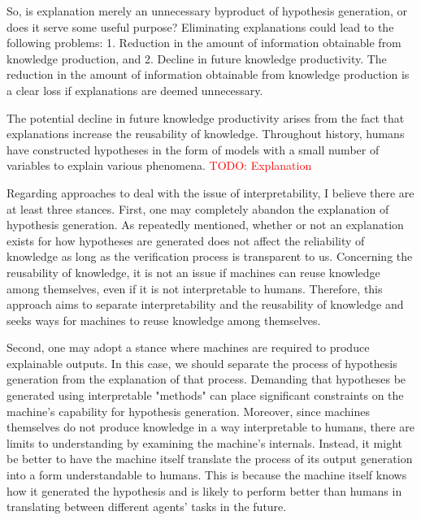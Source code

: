 So, is explanation merely an unnecessary byproduct of hypothesis generation, or does it serve some useful purpose? Eliminating explanations could lead to the following problems: 1. Reduction in the amount of information obtainable from knowledge production, and 2. Decline in future knowledge productivity. The reduction in the amount of information obtainable from knowledge production is a clear loss if explanations are deemed unnecessary.

The potential decline in future knowledge productivity arises from the fact that explanations increase the reusability of knowledge. Throughout history, humans have constructed hypotheses in the form of models with a small number of variables to explain various phenomena. 
\textcolor{red}{TODO: Explanation}

Regarding approaches to deal with the issue of interpretability, I believe there are at least three stances. First, one may completely abandon the explanation of hypothesis generation. As repeatedly mentioned, whether or not an explanation exists for how hypotheses are generated does not affect the reliability of knowledge as long as the verification process is transparent to us. Concerning the reusability of knowledge, it is not an issue if machines can reuse knowledge among themselves, even if it is not interpretable to humans. Therefore, this approach aims to separate interpretability and the reusability of knowledge and seeks ways for machines to reuse knowledge among themselves.

Second, one may adopt a stance where machines are required to produce explainable outputs. In this case, we should separate the process of hypothesis generation from the explanation of that process. Demanding that hypotheses be generated using interpretable "methods" can place significant constraints on the machine's capability for hypothesis generation. Moreover, since machines themselves do not produce knowledge in a way interpretable to humans, there are limits to understanding by examining the machine's internals. Instead, it might be better to have the machine itself translate the process of its output generation into a form understandable to humans. This is because the machine itself knows how it generated the hypothesis and is likely to perform better than humans in translating between different agents' tasks in the future.

